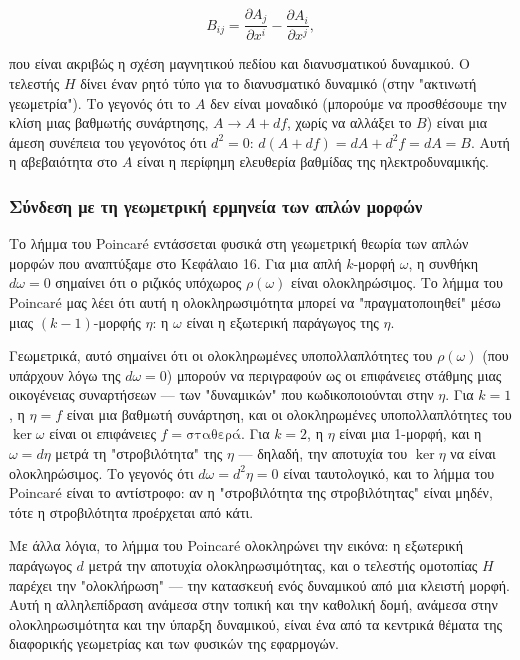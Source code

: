 \documentclass[12pt]{article}
\begin{document}
\[
B_{ij} = \frac{\partial A_j}{\partial x^i} - \frac{\partial A_i}{\partial x^j},
\]

που είναι ακριβώς η σχέση μαγνητικού πεδίου και διανυσματικού δυναμικού. Ο τελεστής $H$ δίνει έναν ρητό τύπο για το διανυσματικό δυναμικό (στην "ακτινωτή γεωμετρία"). Το γεγονός ότι το $A$ δεν είναι μοναδικό (μπορούμε να προσθέσουμε την κλίση μιας βαθμωτής συνάρτησης, $A \to A + df$, χωρίς να αλλάξει το $B$) είναι μια άμεση συνέπεια του γεγονότος ότι $d^2 = 0$: $d(A + df) = dA + d^2f = dA = B$. Αυτή η αβεβαιότητα στο $A$ είναι η περίφημη ελευθερία βαθμίδας της ηλεκτροδυναμικής.

\subsubsection{Σύνδεση με τη γεωμετρική ερμηνεία των απλών μορφών}

Το λήμμα του Poincaré εντάσσεται φυσικά στη γεωμετρική θεωρία των απλών μορφών που αναπτύξαμε στο Κεφάλαιο 16. Για μια απλή $k$-μορφή $\omega$, η συνθήκη $d\omega = 0$ σημαίνει ότι ο ριζικός υπόχωρος $\rho(\omega)$ είναι ολοκληρώσιμος. Το λήμμα του Poincaré μας λέει ότι αυτή η ολοκληρωσιμότητα μπορεί να "πραγματοποιηθεί" μέσω μιας $(k-1)$-μορφής $\eta$: η $\omega$ είναι η εξωτερική παράγωγος της $\eta$.

Γεωμετρικά, αυτό σημαίνει ότι οι ολοκληρωμένες υποπολλαπλότητες του $\rho(\omega)$ (που υπάρχουν λόγω της $d\omega = 0$) μπορούν να περιγραφούν ως οι επιφάνειες στάθμης μιας οικογένειας συναρτήσεων — των "δυναμικών" που κωδικοποιούνται στην $\eta$. Για $k=1$, η $\eta = f$ είναι μια βαθμωτή συνάρτηση, και οι ολοκληρωμένες υποπολλαπλότητες του $\ker \omega$ είναι οι επιφάνειες $f = \text{σταθερά}$. Για $k=2$, η $\eta$ είναι μια 1-μορφή, και η $\omega = d\eta$ μετρά τη "στροβιλότητα" της $\eta$ — δηλαδή, την αποτυχία του $\ker \eta$ να είναι ολοκληρώσιμος. Το γεγονός ότι $d\omega = d^2\eta = 0$ είναι ταυτολογικό, και το λήμμα του Poincaré είναι το αντίστροφο: αν η "στροβιλότητα της στροβιλότητας" είναι μηδέν, τότε η στροβιλότητα προέρχεται από κάτι.

Με άλλα λόγια, το λήμμα του Poincaré ολοκληρώνει την εικόνα: η εξωτερική παράγωγος $d$ μετρά την αποτυχία ολοκληρωσιμότητας, και ο τελεστής ομοτοπίας $H$ παρέχει την "ολοκλήρωση" — την κατασκευή ενός δυναμικού από μια κλειστή μορφή. Αυτή η αλληλεπίδραση ανάμεσα στην τοπική και την καθολική δομή, ανάμεσα στην ολοκληρωσιμότητα και την ύπαρξη δυναμικού, είναι ένα από τα κεντρικά θέματα της διαφορικής γεωμετρίας και των φυσικών της εφαρμογών.
\end{document}
